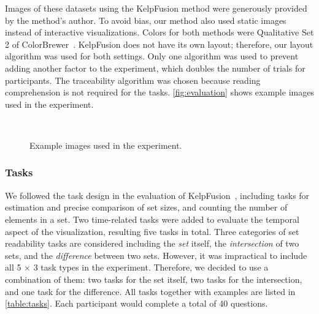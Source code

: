 
Images of these datasets using the KelpFusion method were generously provided by the method's author. To avoid bias, our method also used static images instead of interactive visualizations. Colors for both methods were Qualitative Set 2 of ColorBrewer~\cite{Harrower2003}. KelpFusion does not have its own layout; therefore, our layout algorithm was used for both settings. Only one algorithm was used to prevent adding another factor to the experiment, which doubles the number of trials for participants. The traceability algorithm was chosen because reading comprehension is not required for the tasks. \autoref{fig:evaluation} shows example images used in the experiment.

\begin{figure}
	\centering
	\\
	\caption{Example images used in the experiment.}
	\label{fig:evaluation}
\end{figure}

\subsubsection{Tasks} We followed the task design in the evaluation of KelpFusion~\cite{Meulemans2013}, including tasks for estimation and precise comparison of set sizes, and counting the number of elements in a set. Two time-related tasks were added to evaluate the temporal aspect of the  visualization, resulting five tasks in total. Three categories of set readability tasks are considered including the \textit{set} itself, the \textit{intersection} of two sets, and the \textit{difference} between two sets. However, it was impractical to include all 5 $\times$ 3 task types in the experiment. Therefore, we decided to use a combination of them: two tasks for the set itself, two tasks for the intersection, and one task for the difference. All tasks together with examples are listed in \autoref{table:tasks}. Each participant would complete a total of 40 questions.

